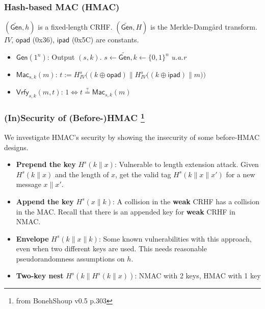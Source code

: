 \begin{frame}\frametitle{Hash-based MAC (HMAC)}
\begin{figure}
\begin{center}

\end{center}
\end{figure}
\begin{construction}
$(\widetilde{\mathsf{Gen}}, h)$ is a fixed-length CRHF. $(\widetilde{\mathsf{Gen}}, H)$ is the Merkle-Damg\r{a}rd transform.
$IV$, $\mathsf{opad}$ (0x36), $\mathsf{ipad}$ (0x5C) are constants.
\begin{itemize}
\item $\mathsf{Gen}(1^n)$: Output $(s, k)$. $s \gets \widetilde{\mathsf{Gen}}, k \gets \{0,1\}^n$ \emph{u.a.r}
\item $\mathsf{Mac}_{s,k}(m)$: $t := H_{IV}^s\Big((k \oplus \mathsf{opad}) \| H_{IV}^s\big((k \oplus \mathsf{ipad}) \| m\big)\Big)$
\item $\mathsf{Vrfy}_{s,k}(m,t)$: $1 \iff t \overset{?}{=} \mathsf{Mac}_{s,k}(m)$
\end{itemize}
\end{construction}
\end{frame}
\begin{frame}\frametitle{(In)Security of (Before-)HMAC \footnote{from BonehShoup v0.5 p.303}}
We investigate HMAC's security by showing the insecurity of some before-HMAC designs.
\begin{itemize}
\item \textbf{Prepend the key} $H^s(k\| x)$: Vulnerable to length extension attack. Given $H^s(k\| x)$ and the length of $x$, get the valid tag $H^s(k\| x \| x')$ for a new message $x \| x'$.
\item \textbf{Append the key} $H^s(x\| k)$: A collision in the \textbf{weak} CRHF has a collision in the MAC. Recall that there is an appended key for \textbf{weak} CRHF in NMAC.
\item \textbf{Envelope} $H^s(k\| x\| k)$: Some known vulnerabilities with this approach, even when two different keys are used. This needs reasonable pseudorandomness assumptions on $h$.
\item \textbf{Two-key nest} $H^s(k \| H^s(k \| x))$: NMAC with 2 keys, HMAC with 1 key
\end{itemize}
\end{frame}
